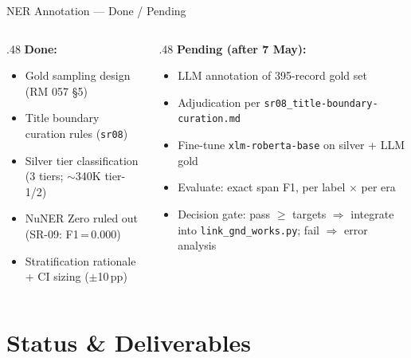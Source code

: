 \documentclass[xcolor,aspectratio=169,compress]{beamer}
\begin{document}
\begin{frame}{NER Annotation --- Done / Pending}
  \small
  \begin{columns}[t]
    \begin{column}{.48\textwidth}
      \textbf{Done:}
      \begin{itemize}\setlength{\itemsep}{2pt}
        \item[$\checkmark$] Gold sampling design (RM 057 §5)
        \item[$\checkmark$] Title boundary curation rules (\texttt{sr08})
        \item[$\checkmark$] Silver tier classification (3 tiers; $\sim$340K tier-1/2)
        \item[$\checkmark$] NuNER Zero ruled out (SR-09: F1\,=\,0.000)
        \item[$\checkmark$] Stratification rationale + CI sizing ($\pm$10\,pp)
      \end{itemize}
    \end{column}
    \begin{column}{.48\textwidth}
      \textbf{Pending (after 7 May):}
      \begin{itemize}\setlength{\itemsep}{2pt}
        \item[$\square$] LLM annotation of 395-record gold set
        \item[$\square$] Adjudication per \texttt{sr08\_title-boundary-curation.md}
        \item[$\square$] Fine-tune \texttt{xlm-roberta-base} on silver + LLM gold
        \item[$\square$] Evaluate: exact span F1, per label $\times$ per era
        \item[$\square$] Decision gate: pass $\geq$ targets $\Rightarrow$ integrate
              into \texttt{link\_gnd\_works.py}; fail $\Rightarrow$ error analysis
      \end{itemize}
    \end{column}
  \end{columns}
\end{frame}


\section{Status \& Deliverables}
\end{document}
